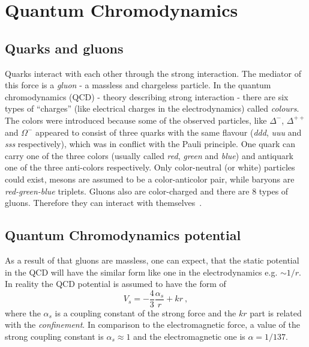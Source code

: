   \section{Quantum Chromodynamics}
    \subsection{Quarks and gluons}
      Quarks interact with each other through the strong interaction.
      The mediator of this force is a \textit{gluon} - a massless and chargeless particle.
      In the quantum chromodynamics (QCD) - theory describing strong interaction - there are six types of ``charges'' (like electrical charges in the electrodynamics) called \textit{colours}.
      The colors were introduced because some of the observed particles, like $\Delta^{-}$, $\Delta^{++}$ and $\Omega^{-}$ appeared to consist of three quarks with the same flavour (\textit{ddd}, \textit{uuu} and \textit{sss} respectively), which was in conflict with the Pauli principle.
      One quark can carry one of the three colors (usually called \textit{red}, \textit{green} and \textit{blue}) and antiquark one of the three anti-colors respectively.
      Only color-neutral (or white) particles could exist, mesons are assumed to be a color-anticolor pair, while baryons are \textit{red-green-blue} triplets.
      Gluons also are color-charged and there are 8 types of gluons.
      Therefore they can interact with themselves~\cite{perkins}.
    \subsection{Quantum Chromodynamics potential}
      As a result of that gluons are massless, one can expect, that the static potential in the QCD will have the similar form like one in the electrodynamics e.g. $\sim 1/r$.
      In reality the QCD potential is assumed to have the form of~\cite{perkins}
      \begin{equation}
        V_s = - \frac{4}{3} \frac{\alpha_s}{r} + kr~,
        \label{eq:qcd_potential}
      \end{equation}
      where the $\alpha_s$ is a coupling constant of the strong force and the $kr$ part is related with the \textit{confinement}.
      In comparison to the electromagnetic force, a value of the strong coupling constant is $\alpha_s \approx 1$ and the electromagnetic one is $\alpha = 1/137$.

